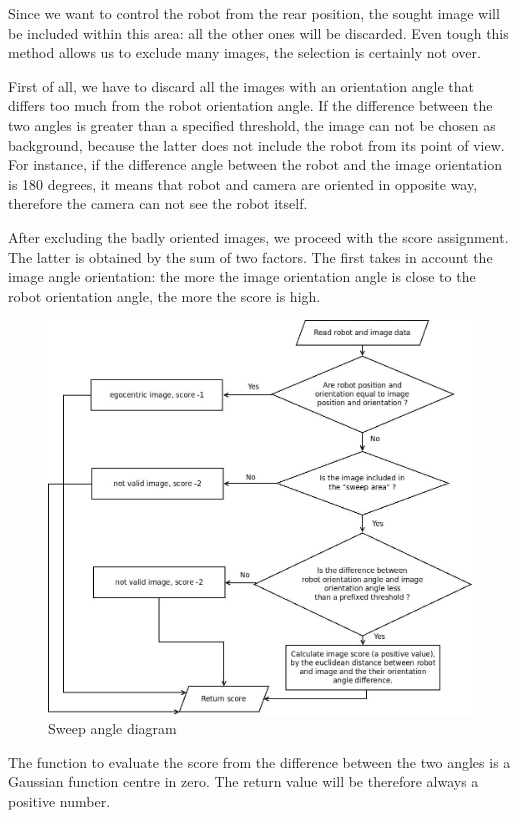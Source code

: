 %
Since we want to control the robot from the rear position, the sought image will be included within
this area: all the other ones will be discarded. Even tough this method allows us to exclude many
images, the selection is certainly not over.
%

%
First of all, we have to discard all the images with an orientation angle that differs too much from the
robot orientation angle. If the difference between the two angles is greater than a specified threshold,
the image can not be chosen as background, because the latter does not include the robot from its point
of view. For instance, if the difference angle between the robot and the image orientation is 180 degrees,
it means that robot and camera are oriented in opposite way, therefore the camera can not see the robot
itself.
%

%
After excluding the badly oriented images, we proceed with the score assignment. The latter is obtained by
the sum of two factors. The first takes in account the image angle orientation: the more the image orientation
angle is close to the robot orientation angle, the more the score is high.
%
\begin{figure}[!h]
  \begin{center}
    \includegraphics[width=400pt]{img/sweep_angle_diagram.jpeg} 
    \caption{Sweep angle diagram}
    \label{fig:sweep_angle_diagram}
  \end{center}
\end{figure}
%
The function to evaluate the score from the difference between the two angles is a Gaussian function centre
in zero. The return value will be therefore always a positive number.
%


